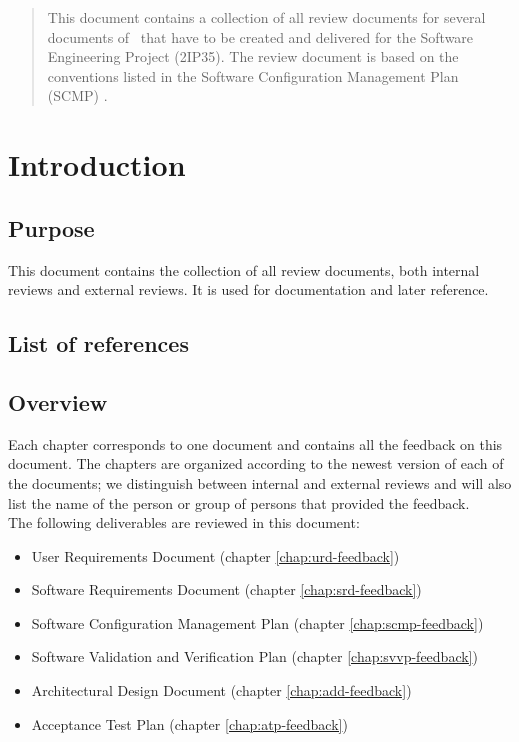 \documentclass[%
		pathtobase=..,%
		titlefull={Review Document},%
		titleabbr=Review,%
		version=0.10]{fingerpaint}
\begin{document}
\maketitle{}

\begin{abstract}
This document contains a collection of all review documents for several documents of \projectname\ that have to be created and delivered for the Software Engineering Project (2IP35). The review document is based on the conventions listed in the Software Configuration Management Plan (SCMP) \cite{scmp}.
\end{abstract}

\tableofcontents



\chapter{Introduction}
\section{Purpose}
This document contains the collection of all review documents, both internal reviews and external reviews. It is used for documentation and later reference.

\section{List of references}


\section{Overview}
Each chapter corresponds to one document and contains all the feedback on this document. The chapters are organized according to the newest version of each of the documents; we distinguish between internal and external reviews and will also list the name of the person or group of persons that provided the feedback. \\
The following deliverables are reviewed in this document:
\begin{itemize}
\item User Requirements Document \cite{urd} (chapter \ref{chap:urd-feedback})
\item Software Requirements Document \cite{srd} (chapter \ref{chap:srd-feedback})
\item Software Configuration Management Plan \cite{scmp} (chapter \ref{chap:scmp-feedback})
\item Software Validation and Verification Plan \cite{svvp} (chapter \ref{chap:svvp-feedback})
\item Architectural Design Document \cite{add} (chapter \ref{chap:add-feedback})
\item Acceptance Test Plan \cite{atp} (chapter \ref{chap:atp-feedback})
\end{itemize}











\end{document}
